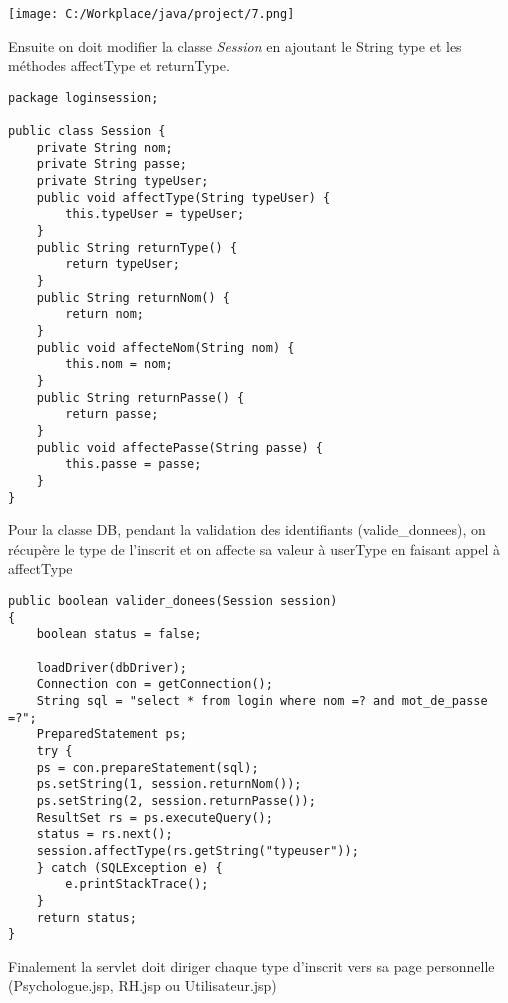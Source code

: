 \documentclass[12]{article}
\begin{document}
\begin{center}
\texttt{[image: C:/Workplace/java/project/7.png]}
\end{center}

\newpage

Ensuite on doit modifier la classe \textit{Session} en ajoutant le String type et les méthodes affectType et returnType.\\

\lstset{language=java}
\begin{lstlisting}
package loginsession;

public class Session {
	private String nom;
	private String passe;
	private String typeUser;
	public void affectType(String typeUser) {
		this.typeUser = typeUser;
	}
	public String returnType() {
		return typeUser;
	}
	public String returnNom() {
		return nom;
	}
	public void affecteNom(String nom) {
		this.nom = nom;
	}
	public String returnPasse() {
		return passe;
	}
	public void affectePasse(String passe) {
		this.passe = passe;
	}
}

\end{lstlisting}

\newpage
Pour la classe DB, pendant la validation des identifiants (valide\_donnees), on récupère le type de l'inscrit et on affecte sa valeur à userType en faisant appel à affectType\\



\lstset{language=java}
\begin{lstlisting}
public boolean valider_donees(Session session)
{
	boolean status = false;

	loadDriver(dbDriver);
	Connection con = getConnection();
	String sql = "select * from login where nom =? and mot_de_passe =?";
	PreparedStatement ps;
	try {
	ps = con.prepareStatement(sql);
	ps.setString(1, session.returnNom());
	ps.setString(2, session.returnPasse());
	ResultSet rs = ps.executeQuery();
	status = rs.next();
	session.affectType(rs.getString("typeuser"));
	} catch (SQLException e) {
		e.printStackTrace();
	}
	return status;
}
\end{lstlisting}

\newpage

Finalement la servlet doit diriger chaque type d'inscrit vers sa page personnelle (Psychologue.jsp, RH.jsp ou Utilisateur.jsp)\\
\end{document}
